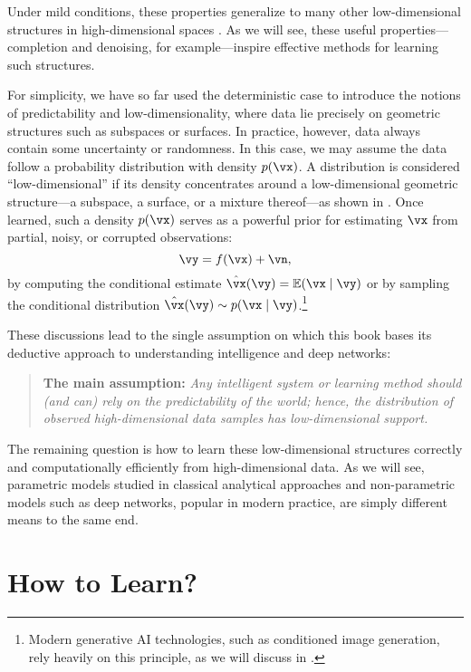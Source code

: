 \documentclass[../../book-main.tex]{subfiles}
\begin{document}
Under mild conditions, these properties generalize to many other low-dimensional structures in high-dimensional spaces \cite{Wright-Ma-2022}. As we will see, these useful properties---completion and denoising, for example---inspire effective methods for learning such structures.

For simplicity, we have so far used the deterministic case to introduce the notions of predictability and low-dimensionality, where data lie precisely on geometric structures such as subspaces or surfaces. In practice, however, data always contain some uncertainty or randomness. In this case, we may assume the data follow a probability distribution with density \(p(\vx)\). A distribution is considered ``low-dimensional'' if its density concentrates around a low-dimensional geometric structure---a subspace, a surface, or a mixture thereof---as shown in . Once learned, such a density \(p(\vx)\) serves as a powerful prior for estimating \(\vx\) from partial, noisy, or corrupted observations:
\begin{equation}
    \vy = f(\vx) + \vn,
    \label{eqn:noisy-observation}
\end{equation}
by computing the conditional estimate \(\hat{\vx}(\vy) = \Ex(\vx \mid \vy)\) or by sampling the conditional distribution \(\hat{\vx}(\vy) \sim p(\vx\mid \vy)\).\footnote{Modern generative AI technologies, such as conditioned image generation, rely heavily on this principle, as we will discuss in .}

These discussions lead to the single assumption on which this book bases its deductive approach to understanding intelligence and deep networks:
\begin{quote}
\textbf{The main assumption:} \textit{Any intelligent system or learning method should (and can) rely on the predictability of the world; hence, the distribution of observed high-dimensional data samples has low-dimensional support.}
\end{quote}
The remaining question is how to learn these low-dimensional structures correctly and computationally efficiently from high-dimensional data. As we will see, parametric models studied in classical analytical approaches and non-parametric models such as deep networks, popular in modern practice, are simply different means to the same end.

\section{How to Learn?}
\end{document}
